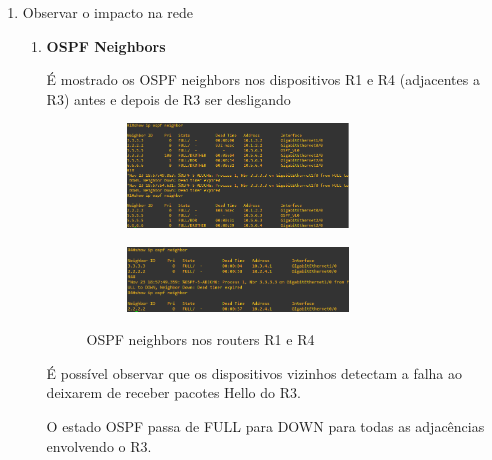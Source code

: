 \documentclass[11pt,english, openright, oneside]{book}
\begin{document}
\begin{enumerate}
\begin{enumerate}
          \pagebreak
          \item Observar o impacto na rede
            \begin{enumerate}
              \item \textbf{OSPF Neighbors} \par \vspace{0.2cm}
                É mostrado os OSPF neighbors nos dispositivos R1 e R4 (adjacentes a R3) antes e depois de R3 ser desligando
                \begin{figure}[h]
                  \centering
                  \begin{subfigure}{.8\textwidth}
                    \centering
                    \includegraphics[width=0.75\textwidth]{imagens/Tarefa6/31.router_failure_2.png}
                  \end{subfigure}
                  \begin{subfigure}{.8\textwidth}
                    \centering
                    \includegraphics[width=0.75\textwidth]{imagens/Tarefa6/31.router_failure_3.png}
                  \end{subfigure}
                  \caption{OSPF neighbors nos routers R1 e R4}
                  \label{fig:config48}
                \end{figure}

                É possível observar que os dispositivos vizinhos detectam a falha ao deixarem de receber pacotes Hello do R3. \par
                O estado OSPF passa de FULL para DOWN para todas as adjacências envolvendo o R3.


\end{enumerate}
\end{enumerate}
\end{enumerate}
\end{document}
